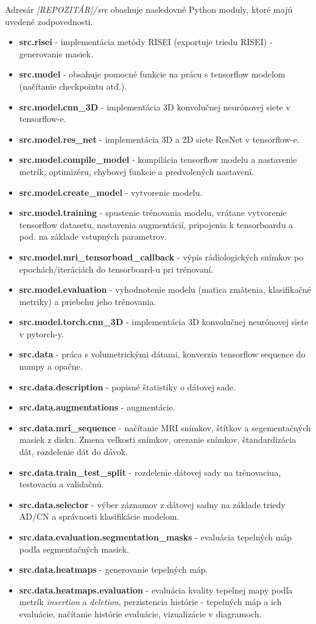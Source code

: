 Adresár \textit{[REPOZITÁR]/src} obashuje nasledovné Python moduly, ktoré majú uvedené zodpovednosti.

\begin{itemize}
    \item \textbf{src.risei} - implementácia metódy RISEI (exportuje triedu RISEI) - generovanie masiek.
    \item \textbf{src.model} - obsahuje pomocné funkcie na prácu s tensorflow modelom (načítanie checkpointu atď.). 
    \item \textbf{src.model.cnn\_3D} - implementácia 3D konvolučnej neurónovej siete v tensorflow-e.
    \item \textbf{src.model.res\_net} - implementácia 3D a 2D siete ResNet v tensorflow-e.
    \item \textbf{src.model.compile\_model} - kompilácia tensorflow modelu a nastavenie metrík, optimizéru, chybovej funkcie a predvolených nastavení.
    \item \textbf{src.model.create\_model} - vytvorenie modelu.
    \item \textbf{src.model.training} - spustenie trénovania modelu, vrátane vytvorenie tensorflow datasetu, nastavenia augmentácií, pripojenia k tensorboardu a pod. na základe vstupných parametrov.
    \item \textbf{src.model.mri\_tensorboad\_callback} - výpis rádiologických snímkov po epochách/iteráciách do tensorboard-u pri trénovaní.
    \item \textbf{src.model.evaluation} - vyhodnotenie modelu (matica zmätenia, klasifikačné metriky) a priebehu jeho trénovania.
    \item \textbf{src.model.torch.cnn\_3D} - implementácia 3D konvolučnej neurónovej siete v pytorch-y.
    \item \textbf{src.data} - práca s volumetrickými dátami, konverzia tensorflow sequence do numpy a opačne.
    \item \textbf{src.data.description} - popisné štatistiky o dátovej sade.
    \item \textbf{src.data.augmentations} - augmentácie.
    \item \textbf{src.data.mri\_sequence} - načítanie MRI snímkov, štítkov a segementačných masiek z disku. Zmena veľkosti snímkov, orezanie snímkov, štandardizácia dát, rozdelenie dát do dávok.
    \item \textbf{src.data.train\_test\_split} - rozdelenie dátovej sady na trénovaciua, testovaciu a validačnú.
    \item \textbf{src.data.selector} - výber záznamov z dátovej sadny na základe triedy AD/CN a správnosti klasifikácie modelom.
    \item \textbf{src.data.evaluation.segmentation\_masks} - evaluácia tepelných máp podľa segmentačných masiek.
    \item \textbf{src.data.heatmaps} - generovanie tepelných máp.
    \item \textbf{src.data.heatmaps.evaluation} - evaluácia kvality tepelnej mapy podľa metrík \textit{insertion} a \textit{deletion}, perzistencia histórie - tepelných máp a ich evaluácie, načítanie histórie evaluácie, vizualizácie v diagramoch. 
\end{itemize}

